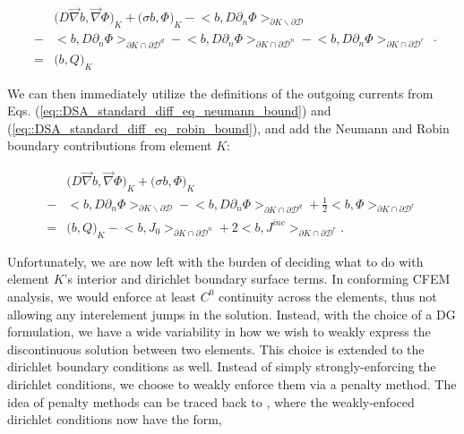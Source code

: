 \begin{equation}
\label{eq::SIP_diff_eq_weak_cellK_wbounds}
\begin{aligned}
&\Big(  D \vec{\nabla}  b , \vec{\nabla} \Phi  \Big)_{K}  + \Big(  \sigma   b ,  \Phi  \Big)_{K}   - \Big<  b, D \partial_n \Phi \Big>_{\partial K \backslash \partial \mathcal{D}}   \\
 - &\Big<  b, D \partial_n \Phi \Big>_{\partial	K \cap \partial \mathcal{D}^d} - \Big<  b, D \partial_n \Phi \Big>_{\partial	K \cap \partial \mathcal{D}^n}  - \Big<  b, D \partial_n \Phi \Big>_{\partial	K \cap \partial \mathcal{D}^r} \\
= &\Big(  b, Q  \Big)_{K} 
\end{aligned} .
\end{equation}

\noindent We can then immediately utilize the definitions of the outgoing currents from Eqs. (\ref{eq::DSA_standard_diff_eq_neumann_bound}) and (\ref{eq::DSA_standard_diff_eq_robin_bound}), and add the Neumann and Robin boundary contributions from element $K$:

\begin{equation}
\label{eq::SIP_diff_eq_weak_cellK_NR}
\begin{aligned}
&\Big(  D \vec{\nabla}  b , \vec{\nabla} \Phi  \Big)_{K}  + \Big(  \sigma   b ,  \Phi  \Big)_{K}  \\
- &\Big<  b, D \partial_n \Phi \Big>_{\partial K \backslash \partial \mathcal{D}} - \Big<  b, D \partial_n \Phi \Big>_{\partial	K \cap \partial \mathcal{D}^d}+ \frac{1}{2} \Big<  b, \Phi  \Big>_{\partial K \cap \partial \mathcal{D}^r} \\
= &\Big(  b, Q  \Big)_{K} - \Big<   b, J_{0}  \Big>_{\partial K \cap \partial \mathcal{D}^n} +  2 \Big<  b, J^{inc}  \Big>_{\partial	K \cap \partial \mathcal{D}^r}.
\end{aligned}
\end{equation}

Unfortunately, we are now left with the burden of deciding what to do with element $K$'s interior and dirichlet boundary surface terms. In conforming CFEM analysis, we would enforce at least $C^0$ continuity across the elements, thus not allowing any interelement jumps in the solution. Instead, with the choice of a DG formulation, we have a wide variability in how we wish to weakly express the discontinuous solution between two elements. This choice is extended to the dirichlet boundary conditions as well. Instead of simply strongly-enforcing the dirichlet conditions, we choose to weakly enforce them via a penalty method. The idea of penalty methods can be traced back to \cite{lions2011problemes}, where the weakly-enfoced dirichlet conditions now have the form,

